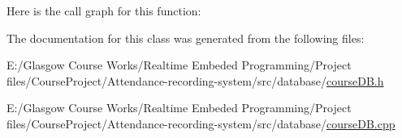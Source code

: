 Here is the call graph for this function\+:




The documentation for this class was generated from the following files\+:\begin{DoxyCompactItemize}
\item 
E\+:/\+Glasgow Course Works/\+Realtime Embeded Programming/\+Project files/\+Course\+Project/\+Attendance-\/recording-\/system/src/database/\hyperlink{course_d_b_8h}{course\+D\+B.\+h}\item 
E\+:/\+Glasgow Course Works/\+Realtime Embeded Programming/\+Project files/\+Course\+Project/\+Attendance-\/recording-\/system/src/database/\hyperlink{course_d_b_8cpp}{course\+D\+B.\+cpp}\end{DoxyCompactItemize}
